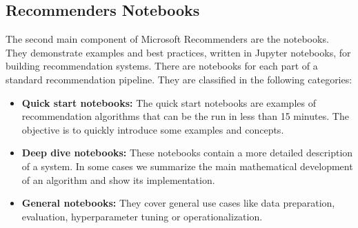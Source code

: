 \subsection{Recommenders Notebooks}

The second main component of Microsoft Recommenders are the notebooks. They demonstrate examples and best practices, 
written in Jupyter notebooks, for building recommendation systems.
There are notebooks for each part of a standard recommendation pipeline. They are
classified in the following categories:
\begin{itemize}
    \item \textbf{Quick start notebooks:} The quick start notebooks are examples of recommendation algorithms that 
    can be the run in less than 15 minutes. The objective is to quickly introduce some examples and concepts.
    \item \textbf{Deep dive notebooks:} These notebooks contain a more detailed description of a system. In some cases
    we summarize the main mathematical development of an algorithm and show its implementation.
    \item \textbf{General notebooks:} They cover general use cases like data preparation, evaluation, hyperparameter
    tuning or operationalization.
\end{itemize}

